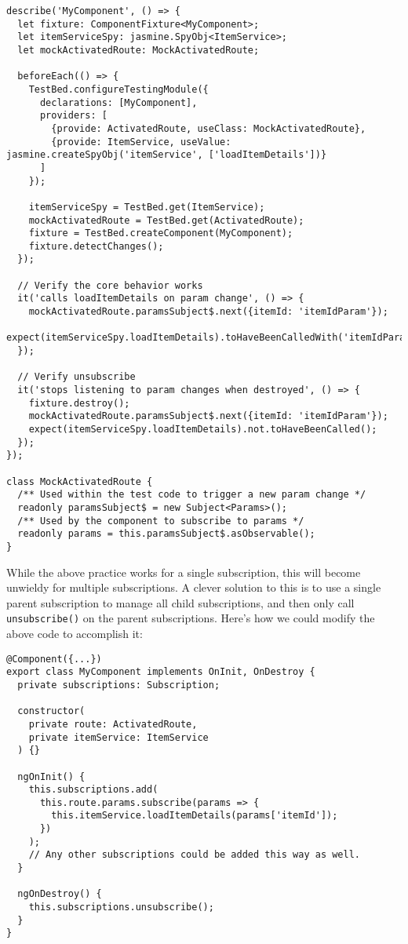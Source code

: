 \begin{lstlisting}
describe('MyComponent', () => {
  let fixture: ComponentFixture<MyComponent>;
  let itemServiceSpy: jasmine.SpyObj<ItemService>;
  let mockActivatedRoute: MockActivatedRoute;

  beforeEach(() => {
    TestBed.configureTestingModule({
      declarations: [MyComponent],
      providers: [
        {provide: ActivatedRoute, useClass: MockActivatedRoute},
        {provide: ItemService, useValue: jasmine.createSpyObj('itemService', ['loadItemDetails'])}
      ]
    });

    itemServiceSpy = TestBed.get(ItemService);
    mockActivatedRoute = TestBed.get(ActivatedRoute);
    fixture = TestBed.createComponent(MyComponent);
    fixture.detectChanges();
  });

  // Verify the core behavior works
  it('calls loadItemDetails on param change', () => {
    mockActivatedRoute.paramsSubject$.next({itemId: 'itemIdParam'});
    expect(itemServiceSpy.loadItemDetails).toHaveBeenCalledWith('itemIdParam');
  });

  // Verify unsubscribe
  it('stops listening to param changes when destroyed', () => {
    fixture.destroy();
    mockActivatedRoute.paramsSubject$.next({itemId: 'itemIdParam'});
    expect(itemServiceSpy.loadItemDetails).not.toHaveBeenCalled();
  });
});

class MockActivatedRoute {
  /** Used within the test code to trigger a new param change */
  readonly paramsSubject$ = new Subject<Params>();
  /** Used by the component to subscribe to params */
  readonly params = this.paramsSubject$.asObservable();
}  
\end{lstlisting}


While the above practice works for a single subscription, this will become unwieldy for multiple subscriptions. A clever solution to this is to use a single parent subscription to manage all child subscriptions, and then only call \lstinline{unsubscribe()} on the parent subscriptions. Here’s how we could modify the above code to accomplish it:

\begin{lstlisting}
@Component({...})
export class MyComponent implements OnInit, OnDestroy {
  private subscriptions: Subscription;

  constructor(
    private route: ActivatedRoute,
    private itemService: ItemService
  ) {}

  ngOnInit() {
    this.subscriptions.add(
      this.route.params.subscribe(params => {
        this.itemService.loadItemDetails(params['itemId']);
      })
    );
    // Any other subscriptions could be added this way as well.
  }

  ngOnDestroy() {
    this.subscriptions.unsubscribe();
  }
}  
\end{lstlisting}

